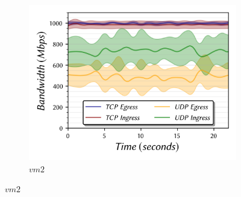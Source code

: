 \documentclass[a4paper,10pt]{article}
\begin{document}
\begin{figure}
\begin{subfigure}{.33\textwidth}
  \includegraphics[width=\hsize]{figs/cluster1/setA/vis-5-vm2-combined.png}
  \caption{$vm2$}
  \label{fig:bw-bidir-1:c}
\end{subfigure}%

\medskip



\end{figure}
\end{document}
